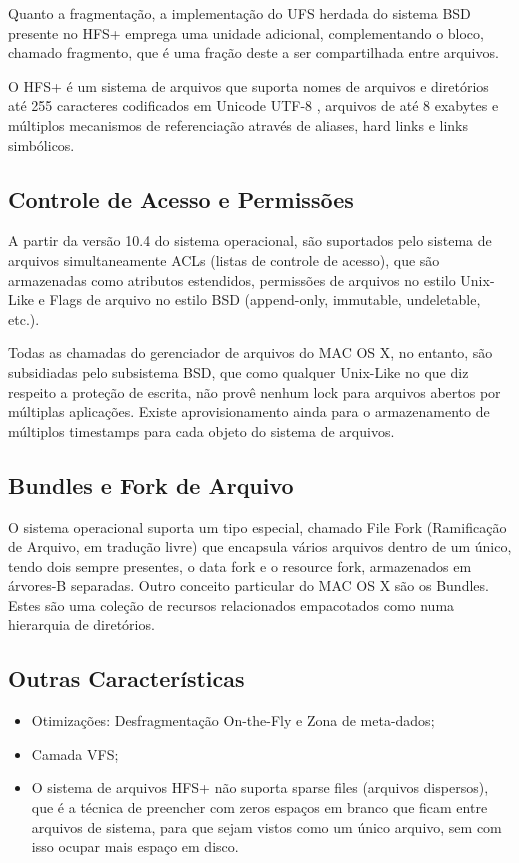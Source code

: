 \documentclass[12pt]{article}
\begin{document}
Quanto a fragmentação, a implementação do UFS herdada do sistema BSD presente no HFS+ emprega uma unidade adicional, complementando o bloco, chamado fragmento, que é uma fração deste a ser compartilhada entre arquivos.

O HFS+ é um sistema de arquivos que suporta nomes de arquivos e diretórios até 255 caracteres codificados em Unicode UTF-8 , arquivos de até 8 exabytes e múltiplos mecanismos de referenciação através de aliases, hard links e links simbólicos.

\subsection{Controle de Acesso e Permissões}
A partir da versão 10.4 do sistema operacional, são suportados pelo sistema de arquivos simultaneamente ACLs (listas de controle de acesso), que são armazenadas como atributos estendidos, permissões de arquivos no estilo Unix-Like e Flags de arquivo no estilo BSD (append-only, immutable, undeletable, etc.).

Todas as chamadas do gerenciador de arquivos do MAC OS X, no entanto, são subsidiadas pelo subsistema BSD, que como qualquer Unix-Like no que diz respeito a proteção de escrita, não provê nenhum lock para arquivos abertos por múltiplas aplicações. Existe aprovisionamento ainda para o armazenamento de múltiplos timestamps para cada objeto do sistema de arquivos.

\subsection{Bundles e Fork de Arquivo}
O sistema operacional suporta um tipo especial, chamado File Fork (Ramificação de Arquivo, em tradução livre) que encapsula vários arquivos dentro
de um único, tendo dois sempre presentes, o data fork e o resource fork, armazenados em árvores-B separadas. Outro conceito particular do MAC OS X são os Bundles. Estes são uma coleção de recursos relacionados empacotados como numa hierarquia de diretórios. 
\subsection{Outras Características }
\begin{itemize}
    \item Otimizações: Desfragmentação On-the-Fly e Zona de meta-dados;
    \item Camada VFS;
    \item O sistema de arquivos HFS+ não suporta sparse files (arquivos dispersos), que é a técnica de preencher com zeros espaços em branco que ficam entre arquivos de sistema, para que sejam vistos como um único arquivo, sem com isso ocupar mais espaço em disco.
\end{itemize}

%
%

\nocite{apple}
\nocite{iokit}
\nocite{file}
\nocite{wiki}
\end{document}

